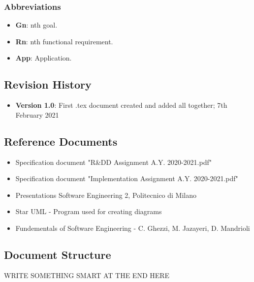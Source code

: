 \subsubsection{Abbreviations}
\begin{itemize}
	\item \textbf{Gn}: nth goal.
	\item \textbf{Rn}: nth functional requirement.
	\item \textbf{App}: Application.
\end{itemize}

\newpage
\subsection{Revision History}
\begin{itemize}
	\item \textbf{Version 1.0}: First .tex document created and added all together; 7th February 2021
\end{itemize}

\newpage
\subsection{Reference Documents}
\begin{itemize}
	\item Specification document "R\&DD Assignment A.Y. 2020-2021.pdf"
	\item Specification document "Implementation Assignment A.Y. 2020-2021.pdf"
	\item Presentations Software Engineering 2, Politecnico di Milano
	\item Star UML - Program used for creating diagrams
	\item Fundementals of Software Engineering - C. Ghezzi, M. Jazayeri, D. Mandrioli
\end{itemize}


\newpage
\subsection{Document Structure}
\hspace{\parindent} WRITE SOMETHING SMART AT THE END HERE
